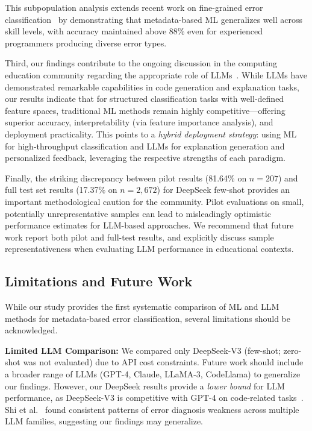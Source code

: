 \documentclass[10pt,a4paper]{article}
\begin{document}
This subpopulation analysis extends recent work on fine-grained error
classification~\cite{altadmri2015most} by demonstrating that
metadata-based ML generalizes well across skill levels, with accuracy
maintained above 88\% even for experienced programmers producing diverse
error types.

Third, our findings contribute to the ongoing discussion in the computing
education community regarding the appropriate role of
LLMs~\cite{finnie2022robots,kazemitabaar2024impact}. While LLMs have
demonstrated remarkable capabilities in code generation and explanation tasks,
our results indicate that for structured classification tasks with
well-defined feature spaces, traditional ML methods remain highly
competitive---offering superior accuracy, interpretability (via feature
importance analysis), and deployment practicality. This points to a
\textit{hybrid deployment strategy}: using ML for high-throughput
classification and LLMs for explanation generation and personalized
feedback, leveraging the respective strengths of each paradigm.

Finally, the striking discrepancy between pilot results (81.64\% on $n=207$)
and full test set results (17.37\% on $n=2{,}672$) for DeepSeek few-shot
provides an important methodological caution for the community.
Pilot evaluations on small, potentially unrepresentative samples can
lead to misleadingly optimistic performance estimates for LLM-based
approaches. We recommend that future work report both pilot and full-test
results, and explicitly discuss sample representativeness when evaluating
LLM performance in educational contexts.

\subsection{Limitations and Future Work}

While our study provides the first systematic comparison of ML and LLM methods
for metadata-based error classification, several limitations should be
acknowledged.

\textbf{Limited LLM Comparison:} We compared only DeepSeek-V3 (few-shot;
zero-shot was not evaluated) due to API cost constraints. Future work should
include a broader range of LLMs (GPT-4, Claude, LLaMA-3, CodeLlama) to
generalize our findings. However, our DeepSeek results provide a \textit{lower
bound} for LLM performance, as DeepSeek-V3 is competitive with GPT-4 on
code-related tasks~\cite{deepseek2024technical}. Shi et
al.~\cite{shi2025benchmarking} found consistent patterns of error diagnosis
weakness across multiple LLM families, suggesting our findings may generalize.
\end{document}
